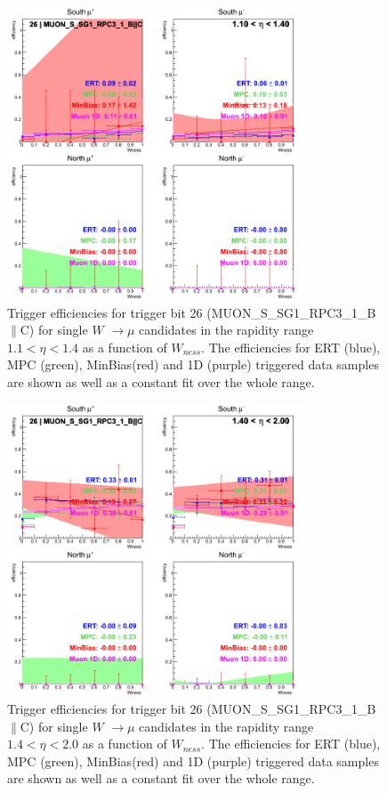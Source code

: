 \begin{figure}[ht]
\begin{center}
\includegraphics[width=0.8\textwidth]{./figures/run13_trigeffisn_eta0_trig26_lin.png}
\caption{\label{fig:run13_trigeffisn_eta0_nper0_trig26_lin} Trigger efficiencies for trigger bit 26 (MUON\_S\_SG1\_RPC3\_1\_B$\|$C) for single $W$ $\rightarrow \mu$ candidates in the rapidity range $ 1.1 < \eta < 1.4$ as a function of $W_{ness}$. The efficiencies for ERT (blue), MPC (green), MinBias(red) and 1D (purple) triggered data samples are shown as well as a constant fit over the whole range.}
\end{center}
\end{figure}
\clearpage
\begin{figure}[ht]
\begin{center}
\includegraphics[width=0.8\textwidth]{./figures/run13_trigeffisn_eta1_trig26_lin.png}
\caption{\label{fig:run13_trigeffisn_eta1_nper0_trig26_lin} Trigger efficiencies for trigger bit 26 (MUON\_S\_SG1\_RPC3\_1\_B$\|$C) for single $W$ $\rightarrow \mu$ candidates in the rapidity range $ 1.4 < \eta < 2.0$ as a function of $W_{ness}$. The efficiencies for ERT (blue), MPC (green), MinBias(red) and 1D (purple) triggered data samples are shown as well as a constant fit over the whole range.}
\end{center}
\end{figure}
